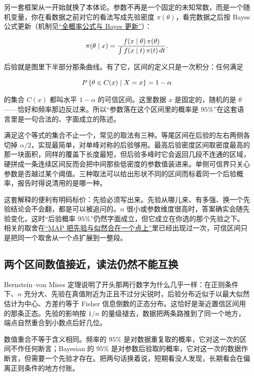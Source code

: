 另一套框架从一开始就换了本体论。参数不再是一个固定的未知常数，而是一个随机变量，你在看数据之前对它的看法写成先验密度 \(\pi(\theta)\)，看完数据之后按 Bayes 公式更新（机制见\hyperref[sec:05-Probability/02-Conditional-Probability/02]{``全概率公式与 Bayes 更新''}）：

\[
\pi(\theta\mid x)=\frac{f(x\mid\theta)\,\pi(\theta)}{\int f(x\mid t)\,\pi(t)\,dt} .
\]

后验就是图里下半部分那条曲线。有了它，区间的定义只是一次积分：任何满足

\[
P\left\{\theta\in C(x)\mid X=x\right\}=1-\alpha
\]

的集合 \(C(x)\) 都叫水平 \(1-\alpha\) 的可信区间。这里数据 \(x\) 是固定的，随机的是 \(\theta\)——恰好和频率那边反过来。所以``参数落在这个区间里的概率是 \(95\%\)''在这套语言里是一句合法的、字面成立的陈述。

满足这个等式的集合不止一个，常见的取法有三种。等尾区间在后验的左右两侧各切掉 \(\alpha/2\)，实现最简单，对单峰对称的后验够用。最高后验密度区间取密度最高的那一块面积，同样的覆盖下长度最短，但后验多峰时它会返回几段不连通的区域，硬拼成一条连续区间反而会把中间那些低密度的参数值装进来。单侧可信界只关心参数是否越过某个阈值。三种取法可以给出形状不同的区间而标着同一个后验概率，报告时得说清用的是哪一种。

这套解释的便利有明码标价：先验必须写出来。先验从哪儿来、有多强、换一个先验结论会不会翻，都是可以被追问的。\(n\) 很小或参数维度很高时，答案确实会随先验变化，这时``后验概率 \(95\%\)''仍然字面成立，但它成立在你选的那个先验之下。相关的取舍在\hyperref[sec:11-Mathematical-Statistics/02-Point-Estimation/04]{``MAP 把先验与似然合在一个点上''}里已经出现过一次，可信区间只是把同一个取舍从一个点扩展到一整段。

\subsection{两个区间数值接近，读法仍然不能互换}

Bernstein--von Mises 定理说明了开头那两行数字为什么几乎一样：在正则条件下、\(n\) 充分大、先验在真值附近为正且不过分尖锐时，后验分布近似于以最大似然估计为中心、方差约等于 Fisher 信息倒数的正态分布。这恰好是渐近置信区间用的那条正态。先验的影响按 \(1/n\) 的量级褪去，数据把两条路推到了同一个地方，端点自然重合到小数点后好几位。

数值重合不等于含义相同。频率的 \(95\%\) 是对数据重复取的概率，它对这一次的区间不作任何断言；Bayesian 的 \(95\%\) 是对参数后验取的概率，它对这一次的数据作断言，但需要一个先验才存在。把两句话换着说，短期看没人发现，长期看会在偏离正则条件的地方付账。

